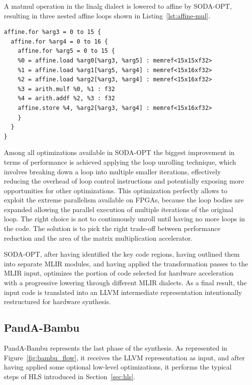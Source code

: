 A matmul operation in the linalg dialect is lowered to affine by SODA-OPT, resulting in three nested affine loops shown in Listing~\ref{lst:affine-mul}.

\begin{lstlisting}[label={lst:affine-mul}, caption=Matrix multiplication in MLIR affine dialect]
affine.for %arg3 = 0 to 15 {
  affine.for %arg4 = 0 to 16 {
    affine.for %arg5 = 0 to 15 {
    %0 = affine.load %arg0[%arg3, %arg5] : memref<15x15xf32>
    %1 = affine.load %arg1[%arg5, %arg4] : memref<15x16xf32>
    %2 = affine.load %arg2[%arg3, %arg4] : memref<15x16xf32>
    %3 = arith.mulf %0, %1 : f32
    %4 = arith.addf %2, %3 : f32
    affine.store %4, %arg2[%arg3, %arg4] : memref<15x16xf32>
    }
  }
}
\end{lstlisting}

Among all optimizations available in SODA-OPT the biggest improvement in terms of performance is achieved applying the loop unrolling technique, which involves breaking down a loop into multiple smaller iterations, effectively reducing the overhead of loop control instructions and potentially exposing more opportunities for other optimizations.
This optimization perfectly allows to exploit the extreme parallelism available on FPGAs, because the loop bodies are expanded allowing the parallel execution of multiple iterations of the original loop.
The right choice is not to continuously unroll until having no more loops in the code.
The solution is to pick the right trade-off between performance reduction and the area of the matrix multiplication accelerator.

SODA-OPT, after having identified the key code regions, having outlined them into separate MLIR modules, and having applied the transformation passes to the MLIR input, optimizes the portion of code selected for hardware acceleration with a progressive lowering through different MLIR dialects.
As a final result, the input code is translated into an LLVM intermediate representation intentionally restructured for hardware synthesis.

\subsection{PandA-Bambu}
\label{subsec:toolchain-panda_bambu}%

PandA-Bambu represents the last phase of the synthesis.
As represented in Figure~\ref{fig:bambu_flow}, it receives the LLVM representation as input, and after having applied some optional low-level optimizations, it performs the typical steps of HLS introduced in Section~\ref{sec:hls}.


